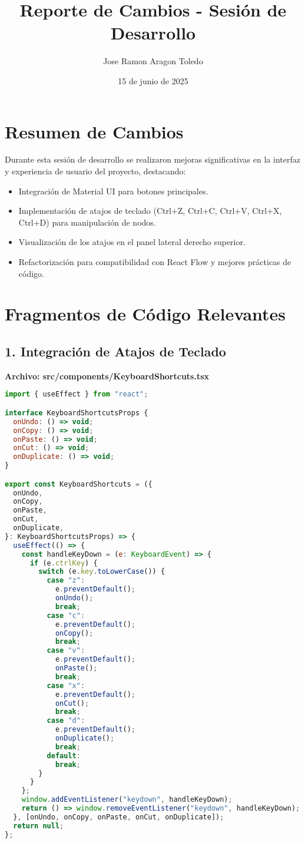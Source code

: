 \documentclass{article}
\title{Reporte de Cambios - Sesión de Desarrollo}
\author{Jose Ramon Aragon Toledo}
\date{15 de junio de 2025}
\begin{document}
\maketitle

\section*{Resumen de Cambios}
Durante esta sesión de desarrollo se realizaron mejoras significativas en la interfaz y experiencia de usuario del proyecto, destacando:
\begin{itemize}
    \item Integración de Material UI para botones principales.
    \item Implementación de atajos de teclado (Ctrl+Z, Ctrl+C, Ctrl+V, Ctrl+X, Ctrl+D) para manipulación de nodos.
    \item Visualización de los atajos en el panel lateral derecho superior.
    \item Refactorización para compatibilidad con React Flow y mejores prácticas de código.
\end{itemize}

\section*{Fragmentos de Código Relevantes}
\subsection*{1. Integración de Atajos de Teclado}
\textbf{Archivo: src/components/KeyboardShortcuts.tsx}
\begin{lstlisting}[language=JavaScript, caption=KeyboardShortcuts.tsx]
import { useEffect } from "react";

interface KeyboardShortcutsProps {
  onUndo: () => void;
  onCopy: () => void;
  onPaste: () => void;
  onCut: () => void;
  onDuplicate: () => void;
}

export const KeyboardShortcuts = ({
  onUndo,
  onCopy,
  onPaste,
  onCut,
  onDuplicate,
}: KeyboardShortcutsProps) => {
  useEffect(() => {
    const handleKeyDown = (e: KeyboardEvent) => {
      if (e.ctrlKey) {
        switch (e.key.toLowerCase()) {
          case "z":
            e.preventDefault();
            onUndo();
            break;
          case "c":
            e.preventDefault();
            onCopy();
            break;
          case "v":
            e.preventDefault();
            onPaste();
            break;
          case "x":
            e.preventDefault();
            onCut();
            break;
          case "d":
            e.preventDefault();
            onDuplicate();
            break;
          default:
            break;
        }
      }
    };
    window.addEventListener("keydown", handleKeyDown);
    return () => window.removeEventListener("keydown", handleKeyDown);
  }, [onUndo, onCopy, onPaste, onCut, onDuplicate]);
  return null;
};
\end{lstlisting}
\end{document}
